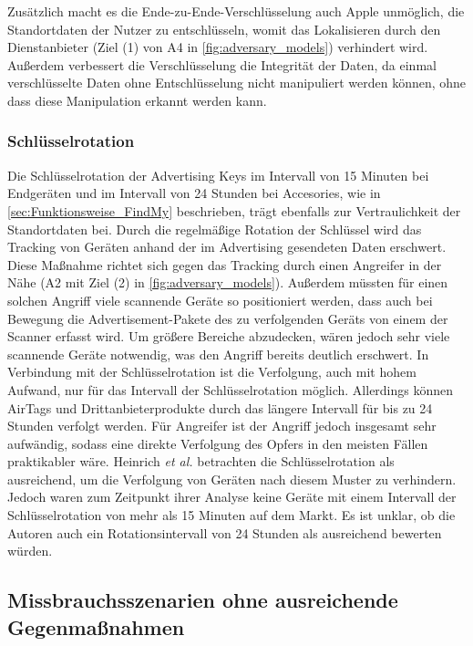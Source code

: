 Zusätzlich macht es die Ende-zu-Ende-Verschlüsselung auch Apple unmöglich, die Standortdaten der Nutzer zu entschlüsseln, womit das Lokalisieren durch den Dienstanbieter (Ziel (1) von A4 in \autoref{fig:adversary_models}) verhindert wird.
Außerdem verbessert die Verschlüsselung die Integrität der Daten, da einmal verschlüsselte Daten ohne Entschlüsselung nicht manipuliert werden können, ohne dass diese Manipulation erkannt werden kann.


\subsubsection{Schlüsselrotation}
Die Schlüsselrotation der Advertising Keys im Intervall von 15 Minuten bei Endgeräten und im Intervall von 24 Stunden bei Accesories, wie in \autoref{sec:Funktionsweise_FindMy} beschrieben, trägt ebenfalls zur Vertraulichkeit der Standortdaten bei.
Durch die regelmäßige Rotation der Schlüssel wird das Tracking von Geräten anhand der im Advertising gesendeten Daten erschwert.
Diese Maßnahme richtet sich gegen das Tracking durch einen Angreifer in der Nähe (A2 mit Ziel (2) in \autoref{fig:adversary_models}).
Außerdem müssten für einen solchen Angriff viele scannende Geräte so positioniert werden, dass auch bei Bewegung die Advertisement-Pakete des zu verfolgenden Geräts von einem der Scanner erfasst wird.
Um größere Bereiche abzudecken, wären jedoch sehr viele scannende Geräte notwendig, was den Angriff bereits deutlich erschwert.
In Verbindung mit der Schlüsselrotation ist die Verfolgung, auch mit hohem Aufwand, nur für das Intervall der Schlüsselrotation möglich.
Allerdings können AirTags und Drittanbieterprodukte durch das längere Intervall für bis zu 24 Stunden verfolgt werden.
Für Angreifer ist der Angriff jedoch insgesamt sehr aufwändig, sodass eine direkte Verfolgung des Opfers in den meisten Fällen praktikabler wäre.
Heinrich \textit{et al.} \cite{Heinrich_FindMy} betrachten die Schlüsselrotation als ausreichend, um die Verfolgung von Geräten nach diesem Muster zu verhindern.
Jedoch waren zum Zeitpunkt ihrer Analyse keine Geräte mit einem Intervall der Schlüsselrotation von mehr als 15 Minuten auf dem Markt.
Es ist unklar, ob die Autoren auch ein Rotationsintervall von 24 Stunden als ausreichend bewerten würden.


\subsection{Missbrauchsszenarien ohne ausreichende Gegenmaßnahmen}
\label{sec:szenarien}

